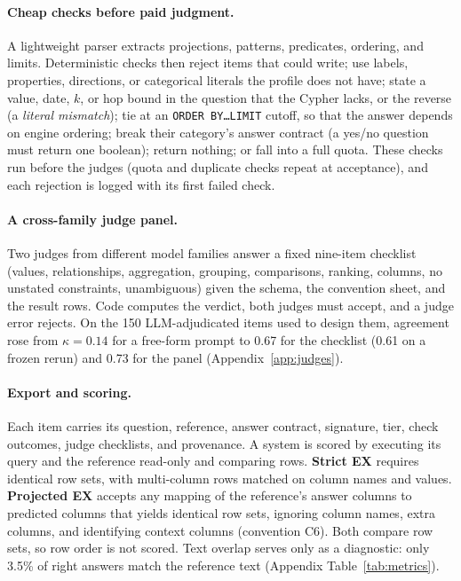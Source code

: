\documentclass[11pt]{article}
\newcommand{\cy}[1]{\texttt{\small #1}}
\begin{document}
\paragraph{Cheap checks before paid judgment.} A lightweight parser extracts projections, patterns, predicates, ordering, and limits. Deterministic checks then reject items that could write; use labels, properties, directions, or categorical literals the profile does not have; state a value, date, $k$, or hop bound in the question that the Cypher lacks, or the reverse (a \emph{literal mismatch}); tie at an \cy{ORDER BY\ldots LIMIT} cutoff, so that the answer depends on engine ordering; break their category's answer contract (a yes/no question must return one boolean); return nothing; or fall into a full quota. These checks run before the judges (quota and duplicate checks repeat at acceptance), and each rejection is logged with its first failed check.

\paragraph{A cross-family judge panel.} Two judges from different model families answer a fixed nine-item checklist (values, relationships, aggregation, grouping, comparisons, ranking, columns, no unstated constraints, unambiguous) given the schema, the convention sheet, and the result rows. Code computes the verdict, both judges must accept, and a judge error rejects. On the 150 LLM-adjudicated items used to design them, agreement rose from $\kappa=0.14$ for a free-form prompt to 0.67 for the checklist (0.61 on a frozen rerun) and 0.73 for the panel (Appendix~\ref{app:judges}).

\paragraph{Export and scoring.} Each item carries its question, reference, answer contract, signature, tier, check outcomes, judge checklists, and provenance. A system is scored by executing its query and the reference read-only and comparing rows. \textbf{Strict EX} requires identical row sets, with multi-column rows matched on column names and values. \textbf{Projected EX} accepts any mapping of the reference's answer columns to predicted columns that yields identical row sets, ignoring column names, extra columns, and identifying context columns (convention C6). Both compare row sets, so row order is not scored. Text overlap serves only as a diagnostic: only 3.5\% of right answers match the reference text (Appendix Table~\ref{tab:metrics}).
\end{document}
